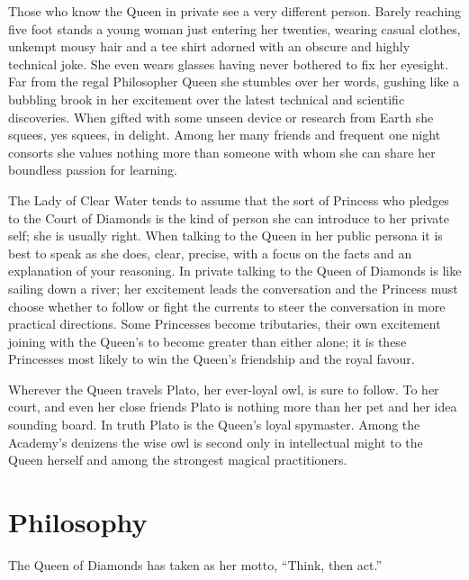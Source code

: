 Those who know the Queen in private see a very different person. Barely reaching five foot stands a young woman just entering her twenties, wearing casual clothes, unkempt mousy hair and a tee shirt adorned with an obscure and highly technical joke. She even wears glasses having never bothered to fix her eyesight. Far from the regal Philosopher Queen she stumbles over her words, gushing like a bubbling brook in her excitement over the latest technical and scientific discoveries. When gifted with some unseen device or research from Earth she squees, yes squees, in delight. Among her many friends and frequent one night consorts she values nothing more than someone with whom she can share her boundless passion for learning.

The Lady of Clear Water tends to assume that the sort of Princess who pledges to the Court of Diamonds is the kind of person she can introduce to her private self; she is usually right. When talking to the Queen in her public persona it is best to speak as she does, clear, precise, with a focus on the facts and an explanation of your reasoning. In private talking to the Queen of Diamonds is like sailing down a river; her excitement leads the conversation and the Princess must choose whether to follow or fight the currents to steer the conversation in more practical directions. Some Princesses become tributaries, their own excitement joining with the Queen's to become greater than either alone; it is these Princesses most likely to win the Queen's friendship and the royal favour.

Wherever the Queen travels Plato, her ever-loyal owl, is sure to follow. To her court, and even her close friends Plato is nothing more than her pet and her idea sounding board. In truth Plato is the Queen's loyal spymaster. Among the Academy's denizens the wise owl is second only in intellectual might to the Queen herself and among the strongest magical practitioners.

\section*{Philosophy}

The Queen of Diamonds has taken as her motto, \textquotedblleft Think, then act.''

